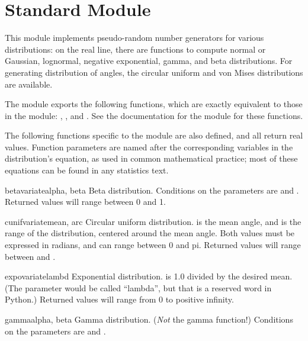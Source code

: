 \section{Standard Module }
\label{module-random}

This module implements pseudo-random number generators for various
distributions: on the real line, there are functions to compute normal
or Gaussian, lognormal, negative exponential, gamma, and beta
distributions.  For generating distribution of angles, the circular
uniform and von Mises distributions are available.

The module exports the following functions, which are exactly
equivalent to those in the  module:
, ,  and
.  See the documentation for the 
module for these functions.

The following functions specific to the  module are also
defined, and all return real values.  Function parameters are named
after the corresponding variables in the distribution's equation, as
used in common mathematical practice; most of these equations can be
found in any statistics text.

\begin{funcdesc}{betavariate}{alpha, beta}
Beta distribution.  Conditions on the parameters are
 and .
Returned values will range between 0 and 1.
\end{funcdesc}

\begin{funcdesc}{cunifvariate}{mean, arc}
Circular uniform distribution.   is the mean angle, and
 is the range of the distribution, centered around the mean
angle.  Both values must be expressed in radians, and can range
between 0 and pi.  Returned values will range between
 and .
\end{funcdesc}

\begin{funcdesc}{expovariate}{lambd}
Exponential distribution.   is 1.0 divided by the desired
mean.  (The parameter would be called ``lambda'', but that is a
reserved word in Python.)  Returned values will range from 0 to
positive infinity.
\end{funcdesc}

\begin{funcdesc}{gamma}{alpha, beta}
Gamma distribution.  (\emph{Not} the gamma function!)  Conditions on
the parameters are  and .
\end{funcdesc}

